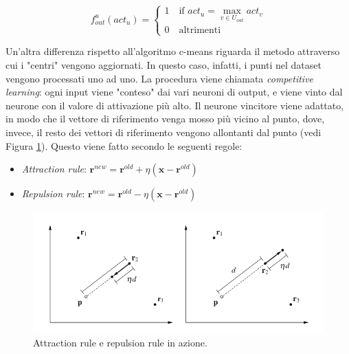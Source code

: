\documentclass[10pt,a4paper]{article}
\begin{document}
$$
f^u_{out} (act_u) = \begin{cases}
					1 \quad \text{if } act_u = \max_{v \in U_{out}} act_v\\
					0 \quad \text{altrimenti}
					\end{cases}
$$

Un'altra differenza rispetto all'algoritmo c-means riguarda il metodo attraverso cui i "centri" vengono aggiornati. In questo caso, infatti, i punti nel dataset vengono processati uno ad uno. La procedura viene chiamata \emph{competitive learning}: ogni input viene "conteso" dai vari neuroni di output, e viene vinto dal neurone con il valore di attivazione più alto. Il neurone vincitore viene adattato, in modo che il vettore di riferimento venga mosso più vicino al punto, dove, invece, il resto dei vettori di riferimento vengono allontanti dal punto (vedi Figura \ref{fig:19}). Questo viene fatto secondo le seguenti regole:

\begin{itemize}
\item{\emph{Attraction rule}: $
\mathbf{r}^{new} = \mathbf{r}^{old} + \eta(\mathbf{x} - \mathbf{r}^{old})
$} 
\item{\emph{Repulsion rule}: $
\mathbf{r}^{new} = \mathbf{r}^{old} - \eta(\mathbf{x} - \mathbf{r}^{old})
$} 
\end{itemize}

\begin{figure}
\centering
\includegraphics[scale=0.4]{img/adapt.png}
\caption{Attraction rule e repulsion rule in azione.}
\label{fig:19}
\end{figure}
\end{document}
